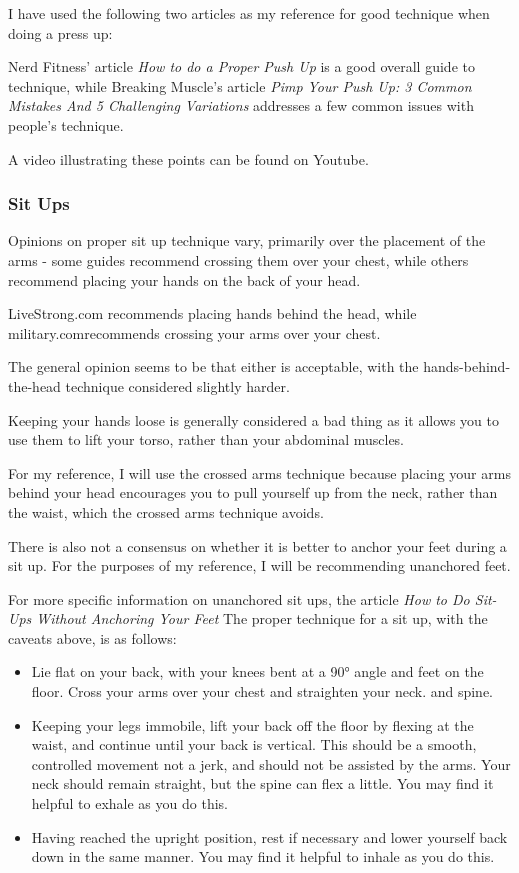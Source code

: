 \documentclass[a4paper]{article}
\begin{document}
I have used the following two articles as my reference for good technique when doing a press up:

Nerd Fitness' article \textit{How to do a Proper Push Up}\cite{bgref16}
is a good overall guide to technique, while Breaking Muscle's article \textit{Pimp Your Push Up: 3 Common Mistakes And 5 Challenging Variations}\cite{bgref17} addresses a few common issues with people's technique.

A video illustrating these points can be found on Youtube.\cite{bgref18}

\subsubsection{Sit Ups}

Opinions on proper sit up technique vary, primarily over the placement of the arms - some guides recommend crossing them over your chest, while others recommend placing your hands on the back of your head. 

LiveStrong.com\cite{bgref19} recommends placing hands behind the head, while military.com\cite{bgref20}recommends crossing your arms over your chest. 

The general opinion seems to be that either is acceptable, with the hands-behind-the-head technique considered slightly harder\cite{bgref21}.

Keeping your hands loose is generally considered a bad thing as it allows you to use them to lift your torso, rather than your abdominal muscles. 

For my reference, I will use the crossed arms technique because placing your arms behind your head encourages you to pull yourself up from the neck, rather than the waist, which the crossed arms technique avoids.

There is also not a consensus on whether it is better to anchor your feet during a sit up. For the purposes of my reference, I will be recommending unanchored feet. 

For more specific information on unanchored sit ups, the article \textit{How to Do Sit-Ups Without Anchoring Your Feet}\cite{bgref22}
The proper technique for a sit up, with the caveats above, is as follows:

\begin{itemize}
    \item Lie flat on your back, with your knees bent at a 90° angle and feet on the floor. Cross your arms over your chest and straighten your neck. and spine.
    \item Keeping your legs immobile, lift your back off the floor by flexing at the waist, and continue until your back is vertical. This should be a smooth, controlled movement not a jerk, and should not be assisted by the arms. Your neck should remain straight, but the spine can flex a little. You may find it helpful to exhale as you do this.
    \item Having reached the upright position, rest if necessary and lower yourself back down in the same manner. You may find it helpful to inhale as you do this.
\end{itemize}
\end{document}
